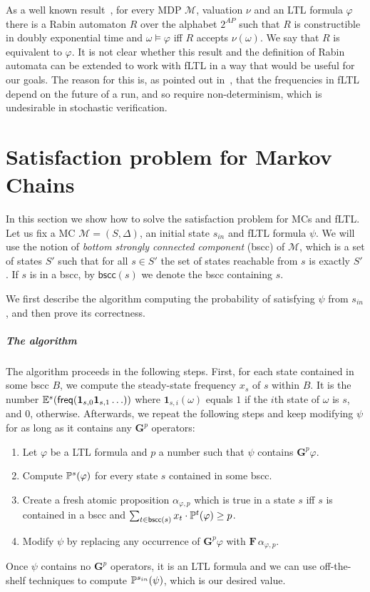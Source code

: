 \documentclass[a4paper,UKenglish]{lipics}
\newcommand{\bscc}[1]{\mathsf{bscc}(#1)}
\newcommand{\mc}{\mathcal{M}}
\newcommand{\mdp}{\mathcal{M}}
\newcommand{\Gf}[1]{\mathbf{G}^{#1}}
\newcommand{\F}{\mathbf{F}\,}
\newcommand{\idf}{\mathbf{1}}
\newcommand{\E}[2][]{\ifblank{#1}{\mathbb{E}(#2)}{\mathbb{E}^{#1}(#2)}}
\renewcommand{\P}[2][]{\ifblank{#1}{\mathbb{P}(#2)}{\mathbb{P}^{#1}(#2)}}
\newcommand{\ssf}[1]{x_{#1}}
\newcommand{\rabin}{R}
\newcommand{\freq}[1]{\mathsf{freq}(#1)}
\newcommand{\sinit}{s_{in}}
\begin{document}
As a well known result~\cite{BP08}, 
for every MDP $\mdp$, valuation $\nu$ and an LTL formula $\varphi$ there is a Rabin automaton $\rabin$ over the alphabet $2^{\mathit{AP}}$ such that $\rabin$ is constructible in doubly exponential time and $\omega\models \varphi$ iff $\rabin$
accepts $\nu(\omega)$. We say that $\rabin$ is equivalent to $\varphi$.
It is not clear whether this result and the definition of Rabin automata can be extended to work with fLTL in a way
that would be useful for our goals. The reason for this is, as pointed out in~\cite[Section 4, Footnote 4]{AT12}, that the frequencies in fLTL depend on the future of a run, and so require non-determinism, which is undesirable in stochastic verification.




\section{Satisfaction problem for Markov Chains}
\label{sec:mc}

In this section we show how to solve the satisfaction problem for MCs and fLTL.
Let us fix a MC $\mc=(S,\Delta)$, an initial state $\sinit$ and fLTL formula $\psi$.
We will use the notion of {\em bottom strongly connected component} (bscc) of $\mc$, which
is a set of
states $S'$ such that for all $s \in S'$ the set of states reachable from $s$
is exactly $S'$. If $s$ is in a bscc, by $\bscc{s}$ we denote the bscc containing $s$.

We first describe the algorithm computing the probability of satisfying $\psi$ from $\sinit$, and
then prove its correctness.

\subparagraph{The algorithm}
The algorithm proceeds in the following steps. First, 
for each state contained in some bscc $B$, we compute the steady-state
frequency $x_s$ of $s$ within $B$. It is the number $\E[s]{\freq{\idf_{s,0}\idf_{s,1}\ldots}}$ where $\idf_{s,i}(\omega)$ equals $1$ if the $i$th state of $\omega$ is $s$, and $0$, otherwise. Afterwards,
we repeat the following steps and keep modifying $\psi$ for as long as it contains any $\Gf{p}$ operators:
\begin{enumerate}
	\item Let $\varphi$ be a LTL formula and $p$ a number such that $\psi$ contains $\Gf{p}\varphi$.
	\item Compute $\P[s]{\varphi}$ for every state $s$ contained in some bscc.
	\item Create a fresh atomic proposition $\alpha_{\varphi,p}$ which is true in a state $s$ iff $s$ is contained in a bscc and
	$\sum_{t\in \bscc{s}} \ssf{t}\cdot \P[t]{\varphi} \ge p$. 
	\item Modify $\psi$ by replacing any occurrence of $\Gf{p}\varphi$ with $\F \alpha_{\varphi,p}$.
\end{enumerate}
Once $\psi$ contains no $\Gf{p}$ operators, it is an LTL formula and we can use off-the-shelf techniques to compute $\P[\sinit]{\psi}$,
which is our desired value.
\end{document}
